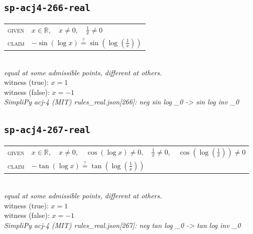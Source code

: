 \documentclass[11pt]{article}
\begin{document}
\subsection*{\texttt{sp-acj4-266-real}}
\begin{tabular}{@{}l@{\quad}l@{}}
\textsc{given} & $x \in \mathbb{R},\quad x \neq 0,\quad \frac{1}{x} \neq 0$ \\[4pt]
\textsc{claim} & $\displaystyle -\sin\left(\log x\right) \overset{?}{=} \sin\left(\log\left(\frac{1}{x}\right)\right)$ \\
\end{tabular}\\[2pt]
{\small\emph{equal at some admissible points, different at others.}}\\
{\footnotesize\color{gray}witness (true): $x = 1$}\\
{\footnotesize\color{gray}witness (false): $x = -1$}\\
\emph{SimpliPy acj-4 (MIT) rules\_real.json[266]: neg sin log \_0  ->  sin log inv \_0}\\

\subsection*{\texttt{sp-acj4-267-real}}
\begin{tabular}{@{}l@{\quad}l@{}}
\textsc{given} & $x \in \mathbb{R},\quad x \neq 0,\quad \cos\left(\log x\right) \neq 0,\quad \frac{1}{x} \neq 0,\quad \cos\left(\log\left(\frac{1}{x}\right)\right) \neq 0$ \\[4pt]
\textsc{claim} & $\displaystyle -\tan\left(\log x\right) \overset{?}{=} \tan\left(\log\left(\frac{1}{x}\right)\right)$ \\
\end{tabular}\\[2pt]
{\small\emph{equal at some admissible points, different at others.}}\\
{\footnotesize\color{gray}witness (true): $x = 1$}\\
{\footnotesize\color{gray}witness (false): $x = -1$}\\
\emph{SimpliPy acj-4 (MIT) rules\_real.json[267]: neg tan log \_0  ->  tan log inv \_0}\\
\end{document}
